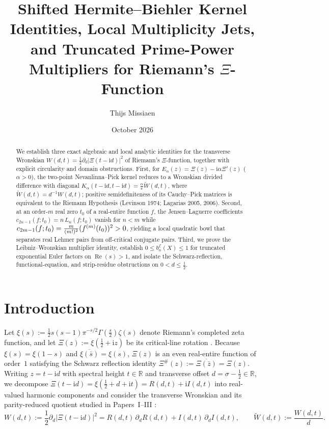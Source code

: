 \documentclass[11pt,reqno]{amsart}
\title[Shifted Hermite--Biehler Kernels and Multiplicity Jets for $\Xi$]{Shifted Hermite--Biehler Kernel Identities, Local Multiplicity Jets, and Truncated Prime-Power Multipliers for Riemann's \texorpdfstring{$\Xi$}{Xi}-Function}
\author{Thijs Missiaen}
\date{October 2026}
\theoremstyle{definition}
\theoremstyle{remark}
\numberwithin{equation}{section}
\newcommand{\ii}{\mathrm{i}}
\newcommand{\Rea}{\operatorname{Re}}
\newcommand{\fac}{\mathclose{\mathchar"0021}}
\begin{document}
\begin{abstract}
We establish three exact algebraic and local analytic identities for the transverse Wronskian $W(d,t) = \frac{1}{2}\partial_d\lvert\Xi(t-\ii d)\rvert^2$ of Riemann's $\Xi$-function, together with explicit circularity and domain obstructions. First, for $E_\alpha(z) = \Xi(z) - \ii\alpha\Xi'(z)$ ($\alpha > 0$), the two-point Nevanlinna--Pick kernel reduces to a Wronskian divided difference with diagonal $K_\alpha(t-\ii d, t-\ii d) = \frac{\alpha}{\pi}\widetilde{W}(d,t)$, where $\widetilde{W}(d,t) = d^{-1}W(d,t)$; positive semidefiniteness of its Cauchy--Pick matrices is equivalent to the Riemann Hypothesis (Levinson 1974; Lagarias 2005, 2006). Second, at an order-$m$ real zero $t_0$ of a real-entire function $f$, the Jensen--Laguerre coefficients $c_{2n-1}(f; t_0) = n\,L_n(f; t_0)$ vanish for $n < m$ while $c_{2m-1}(f; t_0) = \frac{m}{(m\fac)^2}(f^{(m)}(t_0))^2 > 0$, yielding a local quadratic bowl that separates real Lehmer pairs from off-critical conjugate pairs. Third, we prove the Leibniz--Wronskian multiplier identity, establish $0 \le b_n^{\mathcal{E}}(X) \le 1$ for truncated exponential Euler factors on $\Rea(s) > 1$, and isolate the Schwarz-reflection, functional-equation, and strip-residue obstructions on $0 < d \le \frac{1}{2}$.
\end{abstract}

\maketitle

\section{Introduction}\label{sec:intro}

Let $\xi(s) := \frac{1}{2}s(s-1)\pi^{-s/2}\Gamma(\frac{s}{2})\zeta(s)$ denote Riemann's completed zeta function, and let $\Xi(z) := \xi(\frac{1}{2} + \ii z)$ be its critical-line rotation \cite{Riemann1859,Titchmarsh1986}. Because $\xi(s) = \xi(1-s)$ and $\overline{\xi(\bar{s})} = \xi(s)$, $\Xi(z)$ is an even real-entire function of order~$1$ satisfying the Schwarz reflection identity $\Xi^\#(z) := \overline{\Xi(\bar{z})} = \Xi(z)$. Writing $z = t - \ii d$ with spectral height $t \in \mathbb{R}$ and transverse offset $d = \sigma - \frac{1}{2} \in \mathbb{R}$, we decompose $\Xi(t - \ii d) = \xi(\frac{1}{2}+d+\ii t) = R(d,t) + \ii I(d,t)$ into real-valued harmonic components and consider the transverse Wronskian and its parity-reduced quotient studied in Papers~I--III \cite{Missiaen2026Paper1,Missiaen2026Paper2,Missiaen2026Paper3}:
\begin{equation}\label{eq:W_and_Wtilde_intro}
  W(d,t) := \frac{1}{2}\partial_d\lvert\Xi(t - \ii d)\rvert^2 = R(d,t)\,\partial_d R(d,t) + I(d,t)\,\partial_d I(d,t),
  \qquad
  \widetilde{W}(d,t) := \frac{W(d,t)}{d}.
\end{equation}
\end{document}
